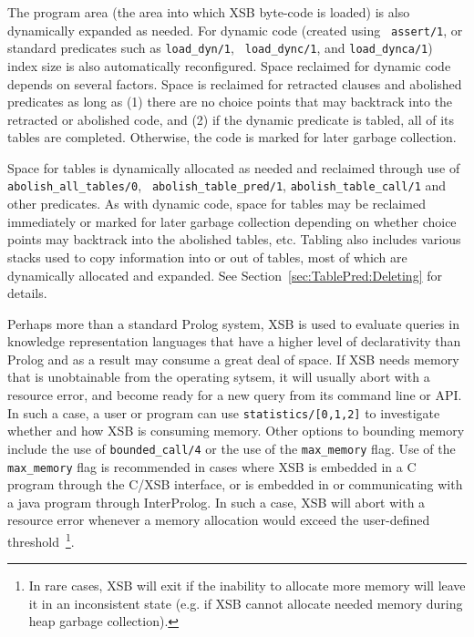 The program area (the area into which XSB byte-code is loaded) is also
dynamically expanded as needed.  For dynamic code (created using {\tt
  assert/1}, or standard predicates such as {\tt load\_dyn/1}, {\tt
  load\_dync/1}, and {\tt load\_dynca/1}) index size is also
automatically reconfigured.  Space reclaimed for dynamic code depends
on several factors.
Space is reclaimed for retracted clauses and abolished predicates as
long as (1) there are no choice points that may backtrack into the
retracted or abolished code, and (2) if the dynamic predicate is
tabled, all of its tables are completed.  Otherwise, the code is
marked for later garbage collection.

Space for tables is dynamically allocated as needed and reclaimed
through use of {\tt abolish\_all\_tables/0}, {\tt
  abolish\_table\_pred/1}, {\tt abolish\_table\_call/1} and other
predicates.  As with dynamic code, space for tables may be reclaimed
immediately or marked for later garbage collection depending on
whether choice points may backtrack into the abolished tables,
etc.  Tabling also includes various stacks
used to copy information into or out of tables, most of which are
dynamically allocated and expanded.
See Section~\ref{sec:TablePred:Deleting} for details.

Perhaps more than a standard Prolog system, XSB is used to evaluate
queries in knowledge representation languages that have a higher level
of declarativity than Prolog and as a result may consume a great deal
of space.  If XSB needs memory that is unobtainable from the operating
sytsem, it will usually abort with a resource error, and become ready
for a new query from its command line or API.  In such a case, a user
or program can use {\tt statistics/[0,1,2]} to investigate whether and
how XSB is consuming memory.  Other options to bounding memory include
the use of {\tt bounded\_call/4} or the use of the {\tt max\_memory}
flag.  Use of the {\tt max\_memory} flag is recommended in cases where
XSB is embedded in a C program through the C/XSB interface, or is
embedded in or communicating with a java program through InterProlog.
In such a case, XSB will abort with a resource error whenever a memory
allocation would exceed the user-defined threshold~\footnote{In rare
  cases, XSB will exit if the inability to allocate more memory will
  leave it in an inconsistent state (e.g. if XSB cannot allocate
  needed memory during heap garbage collection).}.

